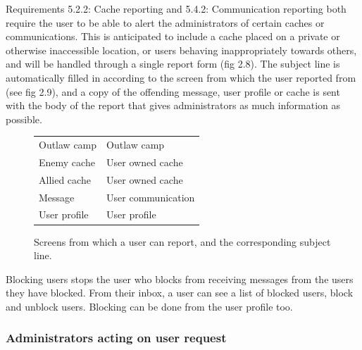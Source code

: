 Requirements 5.2.2: Cache reporting and 5.4.2: Communication reporting both require the user to be able to alert the administrators of certain caches or communications. This is anticipated to include a cache placed on a private or otherwise inaccessible location, or users behaving inappropriately towards others, and will be handled through a single report form (fig 2.8). The subject line is automatically filled in according to the screen from which the user reported from (see fig 2.9), and a copy of the offending message, user profile or cache is sent with the body of the report that gives administrators as much information as possible.

\begin{centering}
\begin{figure}[ht]
	\begin{minipage}{0.5\textwidth}
	\begin{tabularx}{\textwidth}{| X | X |}
		\hline
		Outlaw camp & Outlaw camp \\
		Enemy cache & User owned cache \\
		Allied cache & User owned cache \\
		Message & User communication \\
		User profile & User profile \\
		\hline
	\end{tabularx}
	\caption{Screens from which a user can report,
	and the corresponding subject line.}
	\label{report_table}
	\end{minipage}
\end{figure}
\end{centering}

Blocking users stops the user who blocks from receiving messages from the users they have blocked. From their inbox, a user can see a list of blocked users, block and unblock users. Blocking can be done from the user profile too.

\subsubsection{Administrators acting on user request}

